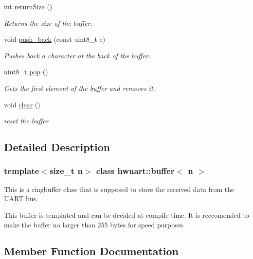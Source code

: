 \begin{DoxyCompactItemize}
int \hyperlink{classhwuart_1_1buffer_a3d3d0797b0d3c17e1a1903129f6f650e}{return\+Size} ()
\begin{DoxyCompactList}\small\item\em Returns the size of the buffer. \end{DoxyCompactList}\item 
void \hyperlink{classhwuart_1_1buffer_aa72858218a0fbf6c1d4d9fa72ea557da}{push\+\_\+back} (const uint8\+\_\+t c)
\begin{DoxyCompactList}\small\item\em Pushes back a character at the back of the buffer. \end{DoxyCompactList}\item 
uint8\+\_\+t \hyperlink{classhwuart_1_1buffer_aa77af13f8079fc875da04b188d018868}{pop} ()
\begin{DoxyCompactList}\small\item\em Gets the first element of the buffer and removes it. \end{DoxyCompactList}\item 
\mbox{\label{classhwuart_1_1buffer_af61bca01072e9d942b26812b38230a06}} 
void \hyperlink{classhwuart_1_1buffer_af61bca01072e9d942b26812b38230a06}{clear} ()
\begin{DoxyCompactList}\small\item\em reset the buffer \end{DoxyCompactList}\end{DoxyCompactItemize}


\subsection{Detailed Description}
\subsubsection*{template$<$size\+\_\+t n$>$\newline
class hwuart\+::buffer$<$ n $>$}

This is a ringbuffer class that is supposed to store the received data from the U\+A\+RT bus. 

This buffer is templated and can be decided at compile time. It is reccomended to make the buffer no larger than 255 bytes for speed purposes 

\subsection{Member Function Documentation}
\mbox{\label{classhwuart_1_1buffer_aa77af13f8079fc875da04b188d018868}} 
